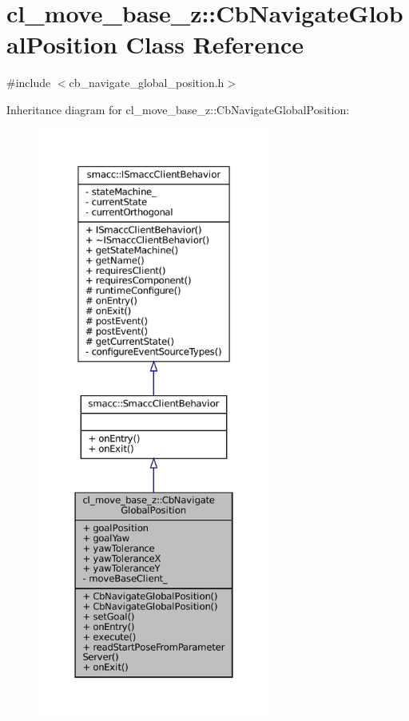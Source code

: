 \hypertarget{classcl__move__base__z_1_1CbNavigateGlobalPosition}{}\section{cl\+\_\+move\+\_\+base\+\_\+z\+:\+:Cb\+Navigate\+Global\+Position Class Reference}
\label{classcl__move__base__z_1_1CbNavigateGlobalPosition}


{\ttfamily \#include $<$cb\+\_\+navigate\+\_\+global\+\_\+position.\+h$>$}



Inheritance diagram for cl\+\_\+move\+\_\+base\+\_\+z\+:\+:Cb\+Navigate\+Global\+Position\+:
\nopagebreak
\begin{figure}[H]
\begin{center}
\leavevmode
\includegraphics[height=550pt]{classcl__move__base__z_1_1CbNavigateGlobalPosition__inherit__graph}
\end{center}
\end{figure}


